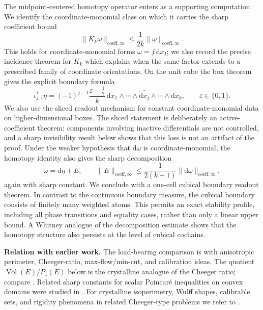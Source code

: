 \documentclass[11pt,letterpaper]{article}
\numberwithin{equation}{section}
\theoremstyle{plain}
\theoremstyle{definition}
\theoremstyle{remark}
\newcommand{\dd}{\mathrm{d}}
\newcommand{\norm}[1]{\lVert #1 \rVert}
\newcommand{\coeff}{\mathrm{coeff}}
\DeclareMathOperator{\Vol}{Vol}
\begin{document}
The midpoint-centered homotopy operator enters as a supporting computation.  We
identify the coordinate-monomial class on which it carries the sharp coefficient
bound
\[
\norm{K_k\omega}_{\coeff,\infty}\le \frac{1}{2k}\norm{\omega}_{\coeff,\infty}.
\]
This holds for coordinate-monomial forms $\omega=f\,\dd x_I$; we also record
the precise incidence theorem for $K_k$ which explains when the same factor
extends to a prescribed family of coordinate orientations.
On the unit cube the box theorem gives the explicit boundary formula
\[
\iota_{j,\varepsilon}^\ast\eta
=
(-1)^{j-1}\frac{\varepsilon-\frac12}{k}\,
\dd x_1\wedge\cdots\wedge\widehat{\dd x_j}\wedge\cdots\wedge \dd x_k,
\qquad
\varepsilon\in\{0,1\}.
\]
We also use the sliced readout mechanism for constant coordinate-monomial
data on higher-dimensional boxes. The sliced statement is deliberately an
active-coefficient theorem: components involving inactive differentials are
not controlled, and a sharp invisibility result below shows that this loss is
not an artifact of the proof. Under the weaker
hypothesis that $\dd\omega$ is coordinate-monomial, the homotopy identity also
gives the sharp decomposition
\[
\omega=\dd\eta+E,
\qquad
\norm{E}_{\coeff,\infty}\le \frac{1}{2(k+1)}\norm{\dd\omega}_{\coeff,\infty},
\]
again with sharp constant. We conclude with a one-cell cubical boundary
readout theorem. In contrast to the continuous boundary measure, the cubical
boundary consists of finitely many weighted atoms. This permits an exact
stability profile, including all phase transitions and equality cases, rather
than only a linear upper bound. A Whitney analogue of the decomposition
estimate shows that the homotopy structure also persists at the level of
cubical cochains.

\medskip
\noindent\textbf{Relation with earlier work.}
The load-bearing comparison is with anisotropic perimeter, Cheeger-ratio,
max-flow/min-cut, and calibration ideas.  The quotient $\Vol(E)/P_1(E)$ below
is the crystalline analogue of the Cheeger ratio; compare
\cite{Cheeger1970,Leonardi2015,Parini2011}.  Related sharp constants for
scalar Poincar\'e inequalities on convex domains were studied in
\cite{PayneWeinberger1960,AcostaDuran2004}.  For crystalline isoperimetry,
Wulff shapes, calibrable sets, and rigidity phenomena in related Cheeger-type
problems we refer to
\cite{Taylor1978,Fonseca1991,FonsecaMuller1991,DacorognaPfister1992,
FigalliZhang2022,DeMason2024,Strang1983,Nozawa1990,Grieser2006,Strang2010,
CasellesFaccioloMeinhardt2009,CasellesChambolleMollNovaga2008,Leonardi2015,
CasellesChambolleNovaga2007,CasellesChambolleNovaga2011}.
\end{document}

